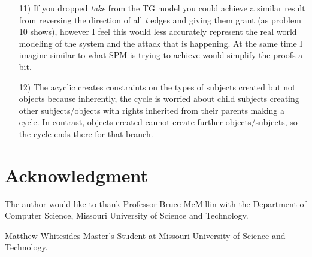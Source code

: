 \documentclass[journal,onecolumn]{IEEEtran}
\begin{document}
\begin{enumerate}
\begin{itemize}
  \end{itemize}
  \item [11)] If you dropped \textit{take} from the TG model you could achieve a similar result from reversing the direction of all \textit{t} edges and giving them grant (as problem 10 shows), however I feel this would less accurately represent the real world modeling of the system and the attack that is happening. At the same time I imagine similar to what SPM is trying to achieve would simplify the proofs a bit. 
  \item [12)] The acyclic creates constraints on the types of subjects created but not objects because inherently, the cycle is worried about child subjects creating other subjects/objects with rights inherited from their parents making a cycle. In contrast, objects created cannot create further objects/subjects, so the cycle ends there for that branch. 
\end{enumerate}




\section*{Acknowledgment}
The author would like to thank Professor Bruce McMillin with the Department of Computer Science, Missouri University of Science and Technology.

\ifCLASSOPTIONcaptionsoff
  \newpage
\fi

\begin{IEEEbiographynophoto}{Matthew Whitesides}
  Master's Student at Missouri University of Science and Technology.
\end{IEEEbiographynophoto}

\end{document}
